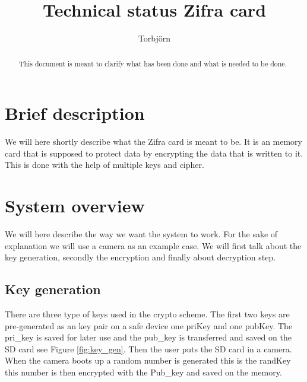 \documentclass[]{article}
\title{Technical status Zifra card}
\author{Torbjörn}
\begin{document}
\maketitle
\tableofcontents
\newpage
\newpage

\begin{abstract}
This document is meant to clarify what has been done and what is needed to be done.
\end{abstract}

\newpage







\section{Brief description}
We will here shortly describe what the Zifra card is meant to be.
It is an memory card that is supposed to protect data by encrypting the data that is written to it.
This is done with the help of multiple \gls{keys} and \gls{cipher}.

\section{System overview}
We will here describe the way we want the system to work.
For the sake of explanation we will use a camera as an example case.
We will first talk about the key generation, secondly the encryption and finally about decryption step.

\subsection{Key generation}
There are three type of keys used in the crypto scheme.
The first two keys are pre-generated as an key pair on a safe device one \acrfull{priKey} and one \acrfull{pubKey}.
The pri\_key is saved for later use and the pub\_key is transferred and saved on the SD card see Figure \ref{fig:key_gen}.
Then the user puts the SD card in a camera.
When the camera boots up a random number is generated this is the \acrfull{randKey} this number is then encrypted with the Pub\_key and saved on the memory.
\end{document}
